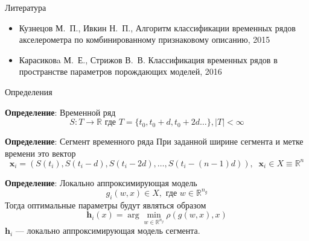 \documentclass{beamer}
\newcommand{\bx}{\mathbf{x}}
\newcommand{\bh}{\mathbf{h}}
\newcommand{\R}{\mathbb{R}}
\begin{document}

    \begin{frame}{Литература}
    \begin{itemize}

    \item Кузнецов М.~П., Ивкин Н.~П., Алгоритм классификации временных рядов акселерометра по комбинированному признаковому описанию, 2015
    \item Карасиковa М.~Е., Стрижов В.~В. Классификация временных рядов в пространстве параметров порождающих моделей, 2016

    \end{itemize}
    \end{frame}




\begin{frame}{Определения}
    \begin{block}{\textbf{Определение}: Временной ряд}
    $$
    S: T \to \R \text{ где } T = \{t_0, t_0 + d, t_0 + 2d \ldots\}, |T| < \infty
    $$
    \end{block}
    \begin{block}{\textbf{Определение}: Сегмент временного ряда}
    При заданной ширине сегмента и метке времени это вектор
    $$
    \bx_i  = (S(t_i), S(t_i - d), S(t_i - 2d), \ldots, S(t_i - (n - 1)d)),
\;\; \bx_i \in X \equiv \R^n
    $$
    \end{block}
    \begin{block}{\textbf{Определение}: Локально аппроксимирующая модель}
        $$
        g_i(w, x) \in X, \text{ где }w \in \R^{n_g}
        $$
        Тогда оптимальные параметры будут являться образом
        $$
        \bh_i(x) = \arg\min_{w \in \R^{n_g}} \rho(g(w, x), x)
        $$
        $\bh_i$ — локально аппроксимирующая модель сегмента.
    \end{block}

\end{frame}

\end{document}
